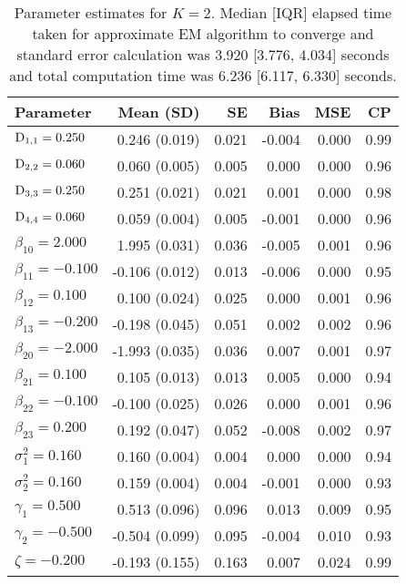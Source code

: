 \begin{table}[ht]
\centering
{}
\captionsetup{font=scriptsize}
\begingroup\scriptsize
\begin{tabular}{l|rrrrr}
  Parameter & Mean (SD) & SE & Bias & MSE & CP \\ 
  \hline
  $\mathrm{D}_{1,1} = 0.250$ &  0.246 (0.019) & 0.021 & -0.004 & 0.000 & 0.99 \\ 
  $\mathrm{D}_{2,2} = 0.060$ &  0.060 (0.005) & 0.005 &  0.000 & 0.000 & 0.96 \\ 
  $\mathrm{D}_{3,3} = 0.250$ &  0.251 (0.021) & 0.021 &  0.001 & 0.000 & 0.98 \\ 
  $\mathrm{D}_{4,4} = 0.060$ &  0.059 (0.004) & 0.005 & -0.001 & 0.000 & 0.96 \\ 
  $\beta_{10} = 2.000$ &  1.995 (0.031) & 0.036 & -0.005 & 0.001 & 0.96 \\ 
  $\beta_{11} = -0.100$ & -0.106 (0.012) & 0.013 & -0.006 & 0.000 & 0.95 \\ 
  $\beta_{12} = 0.100$ &  0.100 (0.024) & 0.025 &  0.000 & 0.001 & 0.96 \\ 
  $\beta_{13} = -0.200$ & -0.198 (0.045) & 0.051 &  0.002 & 0.002 & 0.96 \\ 
  $\beta_{20} = -2.000$ & -1.993 (0.035) & 0.036 &  0.007 & 0.001 & 0.97 \\ 
  $\beta_{21} = 0.100$ &  0.105 (0.013) & 0.013 &  0.005 & 0.000 & 0.94 \\ 
  $\beta_{22} = -0.100$ & -0.100 (0.025) & 0.026 &  0.000 & 0.001 & 0.96 \\ 
  $\beta_{23} = 0.200$ &  0.192 (0.047) & 0.052 & -0.008 & 0.002 & 0.97 \\ 
  $\sigma^2_1 = 0.160$ &  0.160 (0.004) & 0.004 &  0.000 & 0.000 & 0.94 \\ 
  $\sigma^2_2 = 0.160$ &  0.159 (0.004) & 0.004 & -0.001 & 0.000 & 0.93 \\ 
  $\gamma_1 = 0.500$ &  0.513 (0.096) & 0.096 &  0.013 & 0.009 & 0.95 \\ 
  $\gamma_2 = -0.500$ & -0.504 (0.099) & 0.095 & -0.004 & 0.010 & 0.93 \\ 
  $\zeta = -0.200$ & -0.193 (0.155) & 0.163 &  0.007 & 0.024 & 0.99 \\ 
   \hline
\end{tabular}
\endgroup
\caption{Parameter estimates for $K=2$. Median [IQR] elapsed time taken for approximate EM algorithm to converge and standard error calculation was 3.920 [3.776, 4.034] seconds and total computation time was 6.236 [6.117, 6.330] seconds.} 
\end{table}
